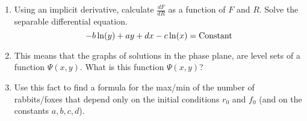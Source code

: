 \begin{enumerate}
\begin{enumerate}
		\item Using an implicit derivative, calculate $\frac{dF}{dR}$ as a function of $F$ and $R$. Solve the separable differential equation.
				$$
				-b \ln(y)+ay +dx-c\ln(x) = {\rm Constant}
				$$
		\item This means that the graphs of solutions in the phase plane, are level sets of a function $\Psi(x,y)$. What is this function $\Psi(x,y)$?
		\item Use this fact to find a formula for the max/min of the number of rabbits/foxes that depend only on the initial conditions $r_0$ and $f_0$ (and on the constants $a,b,c,d$).
		
		
	\end{enumerate}

	
	
		
\end{enumerate}